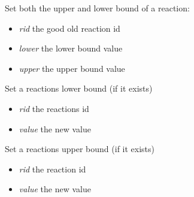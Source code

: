 \documentclass[a4paper,11pt,english]{sphinxmanual}
\begin{document}
\begin{fulllineitems}
\begin{fulllineitems}
\begin{itemize}
\end{itemize}

\end{fulllineitems}


\begin{fulllineitems}
\label{modules_doc:cbmpy.CBModel.Model.setReactionBounds}
Set both the upper and lower bound of a reaction:
\begin{itemize}
\item {} 
\emph{rid} the good old reaction id

\item {} 
\emph{lower} the lower bound value

\item {} 
\emph{upper} the upper bound value

\end{itemize}

\end{fulllineitems}


\begin{fulllineitems}
\label{modules_doc:cbmpy.CBModel.Model.setReactionLowerBound}
Set a reactions lower bound (if it exists)
\begin{itemize}
\item {} 
\emph{rid} the reactions id

\item {} 
\emph{value} the new value

\end{itemize}

\end{fulllineitems}


\begin{fulllineitems}
\label{modules_doc:cbmpy.CBModel.Model.setReactionUpperBound}
Set a reactions upper bound (if it exists)
\begin{itemize}
\item {} 
\emph{rid} the reaction id

\item {} 
\emph{value} the new value


\end{itemize}
\end{fulllineitems}
\end{fulllineitems}
\end{document}
